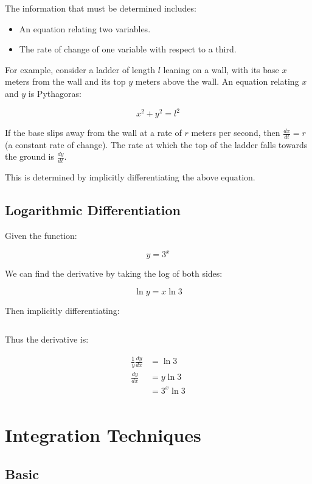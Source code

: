 \documentclass[a4paper,11pt]{report}
\begin{document}
The information that must be determined includes:

\begin{itemize}
\item An equation relating two variables.
\item The rate of change of one variable with respect to a third.
\end{itemize}

For example, consider a ladder of length $l$ leaning on a wall, with its base
$x$ meters from the wall and its top $y$ meters above the wall. An equation
relating $x$ and $y$ is Pythagoras:

$$
x^2 + y^2 = l^2
$$

If the base slips away from the wall at a rate of $r$ meters per second, then
$\frac{dx}{dt} = r$ (a constant rate of change). The rate at which the top
of the ladder falls towards the ground is $\frac{dy}{dt}$.

This is determined by implicitly differentiating the above equation.

\subsection{Logarithmic Differentiation}

Given the function:

$$
y = 3^x
$$

We can find the derivative by taking the log of both sides:

$$
\ln{y} = x \ln{3}
$$

Then implicitly differentiating:

$$
$$

Thus the derivative is:

$$
\begin{aligned}
\frac{1}{y} \frac{dy}{dx} & = \ln{3} \\
\frac{dy}{dx} & = y\ln{3} \\
& = 3^x \ln{3} \\
\end{aligned}
$$


\section{Integration Techniques}

\subsection{Basic}
\end{document}
